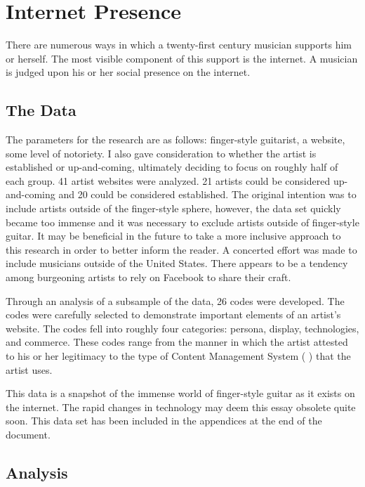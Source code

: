 \documentclass[unicode,hyperfootnotes=false,xetex,colorlinks=true,nofonts,nobib]{tufte-handout}
\newcommand{\textls}[2][5]{%
    \begingroup\addfontfeatures{LetterSpace=#1}#2\endgroup
  }
\renewcommand{\smallcapsspacing}[1]{\textls[10]{#1}}
\renewcommand{\textsc}[1]{\smallcapsspacing{\textsmallcaps{#1}}}
\begin{document}
\section{Internet Presence}
\label{sec:internet-presence}
There are numerous ways in which a twenty-first century musician supports him or herself. The most visible component of this support is the internet. A musician is judged upon his or her social presence on the internet.

\subsection{The Data}
\label{sec:data}
The parameters for the research are as follows: finger-style guitarist, a website, some level of notoriety. I also gave consideration to whether the artist is established or up-and-coming, ultimately deciding to focus on roughly half of each group. 41 artist websites were analyzed. 21 artists could be considered up-and-coming and 20 could be considered established. The original intention was to include artists outside of the finger-style sphere, however, the data set quickly became too immense and it was necessary to exclude artists outside of finger-style guitar. It may be beneficial in the future to take a more inclusive approach to this research in order to better inform the reader. A concerted effort was made to include musicians outside of the United States. There appears to be a tendency among burgeoning artists to rely on Facebook to share their craft.

Through an analysis of a subsample of the data, 26 codes were developed. The codes were carefully selected to demonstrate important elements of an artist's website. The codes fell into roughly four categories: persona, display, technologies, and commerce. These codes range from the manner in which the artist attested to his or her legitimacy to the type of Content Management System (\textsc{cms}) that the artist uses.

This data is a snapshot of the immense world of finger-style guitar as it exists on the internet. The rapid changes in technology may deem this essay obsolete quite soon. This data set has been included in the appendices at the end of the document.

\subsection{Analysis}
\label{sec:analysis}
\end{document}
